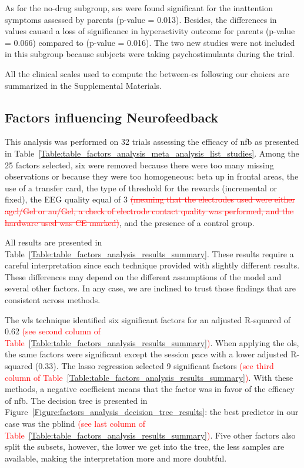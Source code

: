 As for the no-drug subgroup, \glspl{se} were found significant for the inattention symptoms assessed by parents (p-value = 0.013). 
Besides, the differences in \citet{Arnold2014} values caused a loss of significance in hyperactivity outcome for parents 
(p-value = 0.066) compared to \citet{Cortese2016} (p-value = 0.016). The two new studies were not included in this 
subgroup because subjects were taking psychostimulants during the trial.

All the clinical scales used to compute the between-\gls{es} following our choices are summarized in the Supplemental Materials.

\subsection{Factors influencing Neurofeedback}

This analysis was performed on 32 trials assessing the efficacy of \gls{nfb} as presented 
in Table~\ref{Table:table_factors_analysis_meta_analysis_list_studies}. Among the 25 factors selected, six were 
removed because there were too many missing observations or because they were too homogeneous: beta up in frontal areas, 
the use of a transfer card, the type of threshold for the rewards (incremental or fixed), the EEG quality equal of 3
\textcolor{red}{\sout{(meaning that the electrodes used were either \gls{agcl}/Gel or \gls{au}/Gel, a check of electrode contact quality was
performed, and the hardware used was CE marked)}}, and the presence of a control group. 

All results are presented in Table~\ref{Table:table_factors_analysis_results_summary}. These results require a 
careful interpretation since each technique provided with slightly different results. These differences 
may depend on the different assumptions of the model and several other factors. In any case, we are inclined to 
trust those findings that are consistent across methods. 

The \gls{wls} technique identified six significant factors for an adjusted R-squared of 0.62 \textcolor{red}{(see second column of 
Table~\ref{Table:table_factors_analysis_results_summary})}. 
When applying the \gls{ols}, the same factors were significant except the session pace with a lower adjusted R-squared 
(0.33). The \gls{lasso} regression selected 9 significant factors \textcolor{red}{(see third column of 
Table~\ref{Table:table_factors_analysis_results_summary})}. With these methods, a negative coefficient means 
that the factor was in favor of the efficacy of \gls{nfb}. The decision tree is presented in Figure~\ref{Figure:factors_analysis_decision_tree_results}: 
the best predictor in our case was the \gls{pblind} \textcolor{red}{(see last column of 
Table~\ref{Table:table_factors_analysis_results_summary})}. Five other factors also split the subsets, however, 
the lower we get into the tree, the less samples are available, making the interpretation more and more doubtful.  

